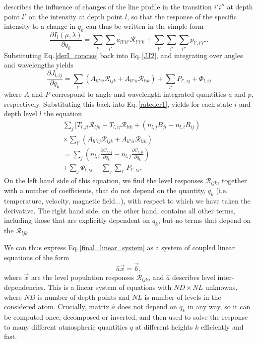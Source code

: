 \documentclass[referee]{aa}
\begin{document}
describes the influence of changes of the line profile in the transition $i'i''$ at depth point $l'$ on the intensity at depth point $l$, so that the response of the specific intensity to a change in $q_k$ can thus be written in the simple form
\begin{equation} 
 \frac{\partial I_l(\mu,\lambda)}{\partial q_k} = \sum_{l'} \sum_{i'} a_{ll'ii'} {\mathcal R}_{l'i'k} + \sum_{l'}\sum_{i'}\sum_{i''} p_{l',i'i''}.
 \label{derI_concise}
\end{equation}
Substituting Eq.\,\ref{derI_concise} back into Eq.\,\ref{JJ2}, and integrating over angles and wavelengths yields
\begin{equation}
 \frac{\partial J_{l,ij}}{\partial q_k} = \sum_{l'} (A_{ll'ij} {\mathcal R}_{ljk}+ A_{ll'ii} {\mathcal R}_{lik}) + \sum_{l'} P_{l',ij} + \Phi_{l,ij}
\end{equation}
where $A$ and $P$ correspond to angle and wavelength integrated quantities $a$ and $p$, respectively. Substituting this back into Eq.\,\ref{rateder1}, yields for each state $i$ and depth level $l$ the equation
\begin{align}
&\sum_j  [ T_{l,ji}\mathcal{R}_{ljk} - T_{l,ij}\mathcal{R}_{lik} + 
(n_{l,j}B_{ji} - n_{l,i}B_{ij})  \nonumber \\
& \times \sum_{l'} (A_{ll'ij} {\mathcal R}_{ljk}+ A_{ll'ii} {\mathcal R}_{lik}) \nonumber \\
& = \sum_j (n_{l,i} \frac{\partial C_{l,ij}}{\partial q_k} - n_{l,j} \frac{\partial C_{l,ji}}{\partial q_k}) \nonumber \\
& + \sum_j \Phi_{l,ij} + \sum_j \sum_{l'} P_{l',ij}.
 \label{final_linear_system}
\end{align}
On the left hand side of this equation, we find the level responses ${\mathcal R}_{ljk}$, together with a number of coefficients, that do not depend on the quantity, $q_k$ (i.e. temperature, velocity, magnetic field...), with respect to which we have taken the derivative. The right hand side, on the other hand, contains all other terms, including those that are explicitly dependent on $q_k$, but no terms that depend on the ${\mathcal R}_{ljk}$. 

We can thus express Eq.\,\ref{final_linear_system} as a system of coupled linear equations of the form
\begin{equation}
 \hat{a} \vec{x} = \vec{b},
\end{equation}
where $\vec{x}$ are the level population responses ${\mathcal R}_{ljk}$, and $\hat{a}$ describes level inter-dependencies. This is a linear system of equations with $ND \times NL$ unknowns, where $ND$ is number of depth points and $NL$ is number of levels in the considered atom. Crucially, matrix $\hat{a}$ does not depend on $q_k$ in any way, so it can be computed once, decomposed or inverted, and then used to solve the response to many different atmospheric quantities $q$ at different heights $k$ efficiently and fast. 
\end{document}
